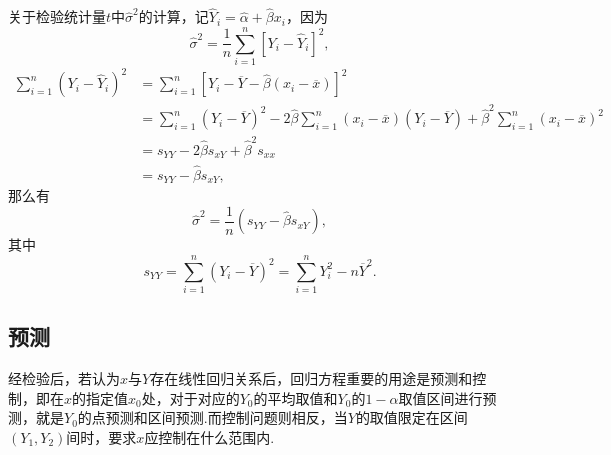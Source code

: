 关于检验统计量\(t\)中\(\hat{\sigma}^2\)的计算，记\(\hat{Y}_i = \hat{\alpha}+\hat{\beta} x_i\)，因为\[
\hat{\sigma}^2 = \frac{1}{n} \sum_{i=1}^n[Y_i-\hat{Y}_i]^2,
\]\begin{align*}
\sum_{i=1}^n(Y_i-\hat{Y}_i)^2
&= \sum_{i=1}^n[Y_i-\overline{Y}-\hat{\beta}(x_i-\overline{x})]^2 \\
&= \sum_{i=1}^n(Y_i-\overline{Y})^2
	-2\hat{\beta} \sum_{i=1}^n(x_i-\overline{x})(Y_i-\overline{Y})
	+\hat{\beta}^2 \sum_{i=1}^n(x_i-\overline{x})^2 \\
&= s_{YY} - 2 \hat{\beta} s_{xY} + \hat{\beta}^2 s_{xx} \\
&= s_{YY} - \hat{\beta} s_{xY},
\end{align*}那么有\[
\hat{\sigma}^2 = \frac{1}{n} (s_{YY} - \hat{\beta} s_{xY}),
\]其中\[
s_{YY} = \sum_{i=1}^n(Y_i - \overline{Y})^2
= \sum_{i=1}^n{Y_i^2 - n\overline{Y}^2}.
\]

\subsection{预测}
经检验后，若认为\(x\)与\(Y\)存在线性回归关系后，回归方程重要的用途是预测和控制，即在\(x\)的指定值\(x_0\)处，对于对应的\(Y_0\)的平均取值和\(Y_0\)的\(1-\alpha\)取值区间进行预测，就是\(Y_0\)的点预测和区间预测.而控制问题则相反，当\(Y\)的取值限定在区间\((Y_1,Y_2)\)间时，要求\(x\)应控制在什么范围内.
